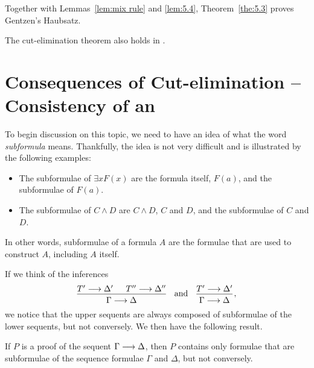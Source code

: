 \documentclass[11pt,a4paper]{article}
\begin{document}
Together with Lemmas~\ref{lem:mix rule} and \ref{lem:5.4},
Theorem~\ref{the:5.3} proves Gentzen's Haubsatz.

\begin{theorem}[Theorem 5.5]\label{the:5.5}
    The cut-elimination theorem also holds in \LJ.
\end{theorem}

\section{\texorpdfstring{Consequences of Cut-elimination -- Consistency of \LK{} an \LJ}{Consequences of Cut-elimination -- Consistency of LK{} an LJ}}

To begin discussion on this topic, we need to have an idea
of what the word \emph{subformula} means. Thankfully,
the idea is not very difficult and is illustrated by
the following examples:
\begin{itemize}
    \item
        The subformulae of \(\exists xF(x)\) are the formula itself,
        \(F(a)\), and the subformulae of \(F(a)\).
    \item
        The subformulae of \(C\land D\) are \(C\land D\), \(C\) and \(D\),
        and the subformulae of \(C\) and \(D\).
\end{itemize}
In other words, subformulae of a formula \(A\) are the formulae that are used
to construct \(A\), including \(A\) itself.

If we think of the inferences
\begin{equation*}
    \begin{prooftree}
        \hypo{T'\seq\Delta'}
        \hypo{T''\seq\Delta''}
        \infer2{\Gamma\seq\Delta}
    \end{prooftree}
    \quad\text{and}\quad
    \begin{prooftree}
        \hypo{T'\seq\Delta'}
        \infer1{\Gamma\seq\Delta}
    \end{prooftree}\,,
\end{equation*}
we notice that the upper sequents are always composed of subformulae
of the lower sequents, but not conversely. We then have the following result.

\begin{theorem}\label{the:subformula property}
    If \(P\) is a proof of the sequent \(\Gamma\longrightarrow\Delta\),
    then \(P\) contains only formulae that are subformulae of
    the sequence formulae \(\Gamma\) and \(\Delta\), but not conversely.
\end{theorem}
\end{document}
